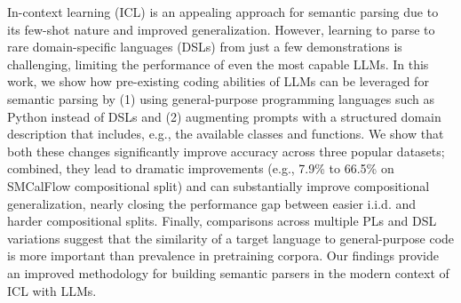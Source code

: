 In-context learning (ICL) is an appealing approach for semantic parsing due to its few-shot nature and improved generalization. However, learning to parse to rare domain-specific languages (DSLs) from just a few demonstrations is challenging, limiting the performance of even the most capable LLMs. In this work, we show how pre-existing coding abilities of LLMs can be leveraged for semantic parsing by (1) using general-purpose programming languages such as Python instead of DSLs and (2) augmenting prompts with a structured domain description that includes, e.g., the available classes and functions. We show that both these changes significantly improve accuracy across three popular datasets; combined, they lead to dramatic improvements (e.g., 7.9\% to 66.5\% on SMCalFlow compositional split) and can substantially improve compositional generalization, nearly closing the performance gap between easier i.i.d. and harder compositional splits. Finally, comparisons across multiple PLs and DSL variations suggest that the similarity of a target language to general-purpose code is more important than prevalence in pretraining corpora. Our findings provide an improved methodology for building semantic parsers in the modern context of ICL with LLMs.